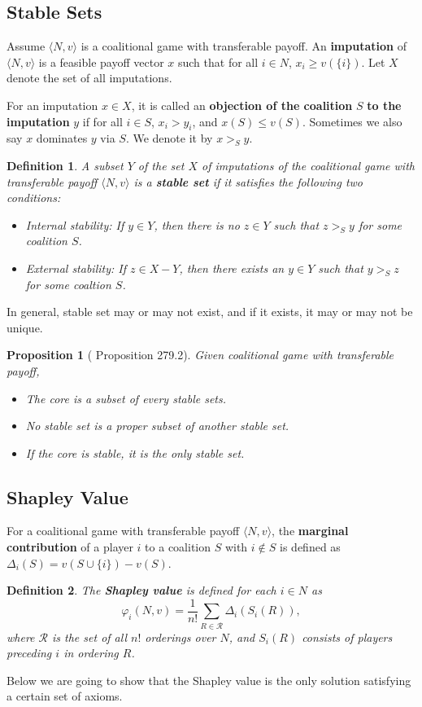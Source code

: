 \documentclass[openany]{book}
\newtheorem{definition}{Definition}[chapter]
\newtheorem{proposition}{Proposition}[chapter]
\theoremstyle{remark}
\begin{document}
\subsection{Stable Sets}
Assume $\langle N,v\rangle$ is a coalitional game with transferable payoff. An \textbf{imputation} of $\langle N,v\rangle$ is a feasible payoff vector $x$ such that for all $i\in N$, $x_i\ge v(\{i\})$. Let $X$ denote the set of all imputations.

For an imputation $x\in X$, it is called an \textbf{objection of the coalition} $S$ \textbf{to the imputation} $y$ if for all $i\in S$, $x_i>y_i$, and $x(S)\le v(S)$. Sometimes we also say $x$ dominates $y$ via $S$. We denote it by $x>_Sy$.
\begin{definition}\label{stableSets}
    A subset $Y$ of the set $X$ of imputations of the coalitional game with transferable payoff $\langle N,v\rangle$ is a \textbf{stable set} if it satisfies the following two conditions:
    \begin{itemize}
        \item Internal stability: If $y\in Y$, then there is no $z\in Y$ such that $z>_Sy$ for some coalition $S$.
        \item External stability: If $z\in X-Y$, then there exists an $y\in Y$ such that $y>_Sz$ for some coaltion $S$.
    \end{itemize}
\end{definition}
In general, stable set may or may not exist, and if it exists, it may or may not be unique.
\begin{proposition}[\cite{OR94} Proposition 279.2]
    Given coalitional game with transferable payoff,
    \begin{itemize}
        \item The core is a subset of every stable sets.
        \item No stable set is a proper subset of another stable set.
        \item If the core is stable, it is the only stable set.
    \end{itemize}
\end{proposition}

\subsection{Shapley Value}
For a coalitional game with transferable payoff $\langle N,v\rangle$, the \textbf{marginal contribution} of a player $i$ to a coalition $S$ with $i\not\in S$ is defined as $\Delta_i(S)=v(S\cup\{i\})-v(S)$.
\begin{definition}\label{def:ShapleyValue}
    The \textbf{Shapley value} is defined for each $i\in N$ as
    \begin{equation}
        \varphi_i(N,v)=\frac{1}{n!}\sum_{R\in \mathcal{R}}^{}\Delta_i(S_i(R)),
    \end{equation}
    where $\mathcal{R}$ is the set of all $n!$ orderings over $N$, and $S_i(R)$ consists of players preceding $i$ in ordering $R$.
\end{definition}
Below we are going to show that the Shapley value is the only solution satisfying a certain set of axioms.
\end{document}

